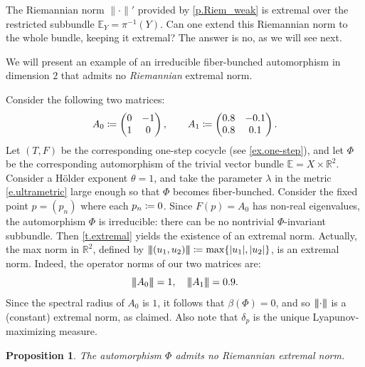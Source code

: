 \documentclass[10pt]{amsart}
\def\vcentcolon{\mathrel{\mathop\ordinarycolon}}
\providecommand\ordinarycolon{:}
\providecommand*\coloneqq{\vcentcolon\mathrel{\mkern-1.2mu}=}
\theoremstyle{plain}
\newtheorem{proposition}[theorem]{Proposition}
\theoremstyle{definition}
\newcommand{\tribar}[1]{\mathopen{| {\kern -1.5pt} | {\kern -1.5pt} |} {#1}
\mathclose{| {\kern -1.5pt} | {\kern -1.5pt} |}}
\newcommand{\RR}{\mathbb{R}}
\newcommand{\EE}{\mathbb{E}}
\begin{document}
The Riemannian norm $\| \mathord{\cdot} \|'$ provided by \cref{p.Riem_weak} is extremal over the restricted subbundle $\EE_Y = \pi^{-1}(Y)$. Can one extend this Riemannian norm to the whole bundle, keeping it extremal?
The answer is no, as we will see next.

We will present an example of an irreducible fiber-bunched automorphism in dimension $2$ that admits no \emph{Riemannian} extremal norm.

Consider the following two matrices:
\begin{equation}\label{e.two_matrices}
A_0 \coloneqq \begin{pmatrix} 0 & -1 \\ 1 & 0 \end{pmatrix}, \qquad
A_1 \coloneqq \begin{pmatrix} 0.8 & -0.1 \\ 0.8 & 0.1 \end{pmatrix}.
\end{equation}
Let $(T,F)$ be the corresponding one-step cocycle (see \cref{ex.one-step}),
and let $\Phi$ be the corresponding automorphism of the trivial vector bundle $\EE = X \times \RR^2$.
Consider a Hölder exponent $\theta = 1$, and take the parameter $\lambda$ in the metric \eqref{e.ultrametric} large enough so that $\Phi$ becomes fiber-bunched.
Consider the fixed point $p=(p_n)$ where each $p_n \coloneqq 0$.
Since $F(p) = A_0$ has non-real eigenvalues, the automorphism $\Phi$ is irreducible: there can be no nontrivial $\Phi$-invariant subbundle.
Then \cref{t.extremal} yields the existence of an extremal norm.
Actually, the max norm in $\RR^2$, defined by
$\tribar{(u_1,u_2)} \coloneqq \max\{|u_1|,|u_2|\}$, is an extremal norm.
Indeed, the operator norms of our two matrices are:
\[
\tribar{A_0} = 1, \quad \tribar{A_1} = 0.9.
\]
Since the spectral radius of $A_0$ is $1$, it follows that $\beta(\Phi) = 0$, and so $\tribar{\mathord{\cdot}}$ is a (constant) extremal norm, as claimed. Also note that $\delta_p$ is the unique Lyapunov-maximizing measure.

\begin{proposition}\label{p.no_Riemann}
The automorphism $\Phi$ admits no Riemannian extremal norm.
\end{proposition}
\end{document}

